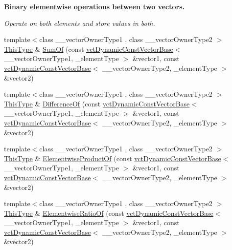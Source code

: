\begin{Indent}{\bf Binary elementwise operations between two vectors.}\par
{\em Operate on both elements and store values in both. }\begin{DoxyCompactItemize}
\item 
{\footnotesize template$<$class \+\_\+\+\_\+vector\+Owner\+Type1 , class \+\_\+\+\_\+vector\+Owner\+Type2 $>$ }\\\hyperlink{classvct_dynamic_const_vector_base_a39da273523717f678f54d3321ebca3dd}{This\+Type} \& \hyperlink{classvct_dynamic_vector_base_a84f320f980e99e4e0ca50791e2cb1135}{Sum\+Of} (const \hyperlink{classvct_dynamic_const_vector_base}{vct\+Dynamic\+Const\+Vector\+Base}$<$ \+\_\+\+\_\+vector\+Owner\+Type1, \+\_\+element\+Type $>$ \&vector1, const \hyperlink{classvct_dynamic_const_vector_base}{vct\+Dynamic\+Const\+Vector\+Base}$<$ \+\_\+\+\_\+vector\+Owner\+Type2, \+\_\+element\+Type $>$ \&vector2)
\item 
{\footnotesize template$<$class \+\_\+\+\_\+vector\+Owner\+Type1 , class \+\_\+\+\_\+vector\+Owner\+Type2 $>$ }\\\hyperlink{classvct_dynamic_const_vector_base_a39da273523717f678f54d3321ebca3dd}{This\+Type} \& \hyperlink{classvct_dynamic_vector_base_a5aaf9ec315eff49da3966255f7378ab8}{Difference\+Of} (const \hyperlink{classvct_dynamic_const_vector_base}{vct\+Dynamic\+Const\+Vector\+Base}$<$ \+\_\+\+\_\+vector\+Owner\+Type1, \+\_\+element\+Type $>$ \&vector1, const \hyperlink{classvct_dynamic_const_vector_base}{vct\+Dynamic\+Const\+Vector\+Base}$<$ \+\_\+\+\_\+vector\+Owner\+Type2, \+\_\+element\+Type $>$ \&vector2)
\item 
{\footnotesize template$<$class \+\_\+\+\_\+vector\+Owner\+Type1 , class \+\_\+\+\_\+vector\+Owner\+Type2 $>$ }\\\hyperlink{classvct_dynamic_const_vector_base_a39da273523717f678f54d3321ebca3dd}{This\+Type} \& \hyperlink{classvct_dynamic_vector_base_afc8c54fbb85155eefbeaf1d2d31fcc84}{Elementwise\+Product\+Of} (const \hyperlink{classvct_dynamic_const_vector_base}{vct\+Dynamic\+Const\+Vector\+Base}$<$ \+\_\+\+\_\+vector\+Owner\+Type1, \+\_\+element\+Type $>$ \&vector1, const \hyperlink{classvct_dynamic_const_vector_base}{vct\+Dynamic\+Const\+Vector\+Base}$<$ \+\_\+\+\_\+vector\+Owner\+Type2, \+\_\+element\+Type $>$ \&vector2)
\item 
{\footnotesize template$<$class \+\_\+\+\_\+vector\+Owner\+Type1 , class \+\_\+\+\_\+vector\+Owner\+Type2 $>$ }\\\hyperlink{classvct_dynamic_const_vector_base_a39da273523717f678f54d3321ebca3dd}{This\+Type} \& \hyperlink{classvct_dynamic_vector_base_a39deeeee45de88cd2408d8e4de3306fb}{Elementwise\+Ratio\+Of} (const \hyperlink{classvct_dynamic_const_vector_base}{vct\+Dynamic\+Const\+Vector\+Base}$<$ \+\_\+\+\_\+vector\+Owner\+Type1, \+\_\+element\+Type $>$ \&vector1, const \hyperlink{classvct_dynamic_const_vector_base}{vct\+Dynamic\+Const\+Vector\+Base}$<$ \+\_\+\+\_\+vector\+Owner\+Type2, \+\_\+element\+Type $>$ \&vector2)

\end{DoxyCompactItemize}
\end{Indent}
